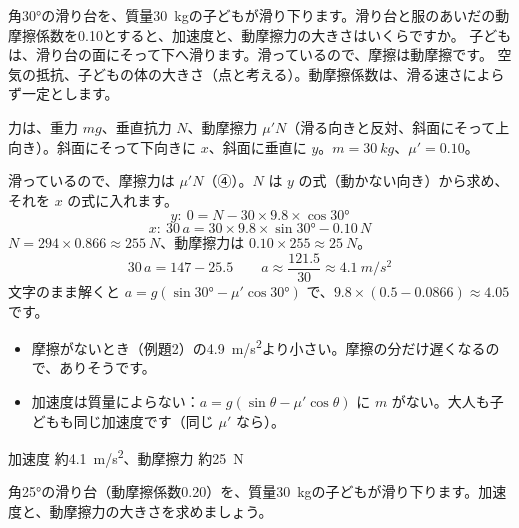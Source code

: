 \begin{phreidai}[滑り台]
\label{ph:力-2:ex3}角30°の滑り台を、質量\qty{30}{kg}の子どもが滑り下ります。滑り台と服のあいだの動摩擦係数を0.10とすると、加速度と、動摩擦力の大きさはいくらですか。
\phbamen
子どもは、滑り台の面にそって下へ滑ります。滑っているので、摩擦は動摩擦です。
\phmushi
空気の抵抗、子どもの体の大きさ（点と考える）。動摩擦係数は、滑る速さによらず一定とします。
\phzu
\noindent\begin{minipage}[c]{0.44\linewidth}\centering
{}
\end{minipage}\hfill
\begin{minipage}[c]{0.53\linewidth}
力は、重力 $mg$、垂直抗力 $N$、動摩擦力 $\mu'N$（滑る向きと反対、斜面にそって上向き）。斜面にそって下向きに $x$、斜面に垂直に $y$。$m=\qty{30}{kg}$、$\mu'=0.10$。
\end{minipage}
\phriyu
滑っているので、摩擦力は $\mu'N$（④）。$N$ は $y$ の式（動かない向き）から求め、それを $x$ の式に入れます。
\phtateru
\[ y:\ 0=N-30\times9.8\times\cos30° \]
\[ x:\ 30\,a=30\times9.8\times\sin30°-0.10\,N \]
\phtoku
$N=294\times0.866\approx\qty{255}{N}$、動摩擦力は $0.10\times255\approx\qty{25}{N}$。
\[ 30\,a=147-25.5\qquad a\approx\frac{121.5}{30}\approx\qty{4.1}{m/s^2} \]
文字のまま解くと $a=g(\sin30°-\mu'\cos30°)$ で、$9.8\times(0.5-0.0866)\approx4.05$ です。
\phtashikame
\begin{itemize}[leftmargin=1.2\zw, itemsep=1pt, topsep=1pt, label={\color{bkTheme}●}]
\item 摩擦がないとき（例題2）の\qty{4.9}{m/s^2}より小さい。摩擦の分だけ遅くなるので、ありそうです。
\item 加速度は質量によらない：$a=g(\sin\theta-\mu'\cos\theta)$ に $m$ がない。大人も子どもも同じ加速度です（同じ $\mu'$ なら）。
\end{itemize}
\kotae 加速度 約\qty{4.1}{m/s^2}、動摩擦力 約\qty{25}{N}
\end{phreidai}
\begin{jibun}
角25°の滑り台（動摩擦係数0.20）を、質量\qty{30}{kg}の子どもが滑り下ります。加速度と、動摩擦力の大きさを求めましょう。
\end{jibun}

